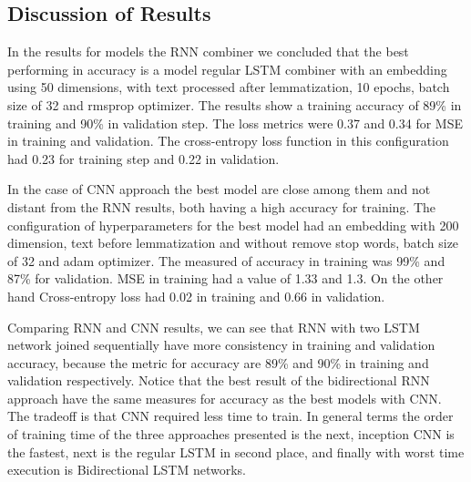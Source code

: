 \documentclass[12pt]{report}
\begin{document}
\subsection{Discussion of Results}

In the results for models  the \ac{RNN} combiner we concluded that the best performing in accuracy  is a model regular LSTM combiner with an embedding using 50 dimensions, with text processed after lemmatization, 10 epochs, batch size of 32 and rmsprop optimizer. The results show a training accuracy of 89\% in training and 90\% in validation step. The loss metrics were 0.37 and 0.34 for {MSE} in training and validation. The cross-entropy loss function in this configuration had 0.23 for training step and 0.22 in validation.

In the case of {CNN} approach the best model are close among them and not distant from the \ac{RNN} results, both having a high accuracy for training. The configuration of hyperparameters for the best model had an embedding with  200 dimension, text before lemmatization and without remove stop words, batch size of 32 and adam optimizer. The measured of accuracy in training was 99\% and 87\% for validation. {MSE} in training had a value of 1.33 and 1.3. On the other hand Cross-entropy loss had 0.02 in training and 0.66 in validation. 



Comparing \ac{RNN} and \ac{CNN} results, we can see that {RNN} with two {LSTM} network joined sequentially have more consistency in training and validation accuracy, because the metric for accuracy are 89\% and 90\% in training and validation respectively. 
Notice that the best result of the bidirectional \ac{RNN} approach have the same measures for accuracy as the best models with \ac{CNN}.  The tradeoff is 
that \ac{CNN} required less time to train. In general terms the order of training time of the three approaches presented is the next, inception {CNN} is the fastest, next is the regular \ac{LSTM} in second place, and finally with worst time execution is Bidirectional {LSTM} networks.
\end{document}

